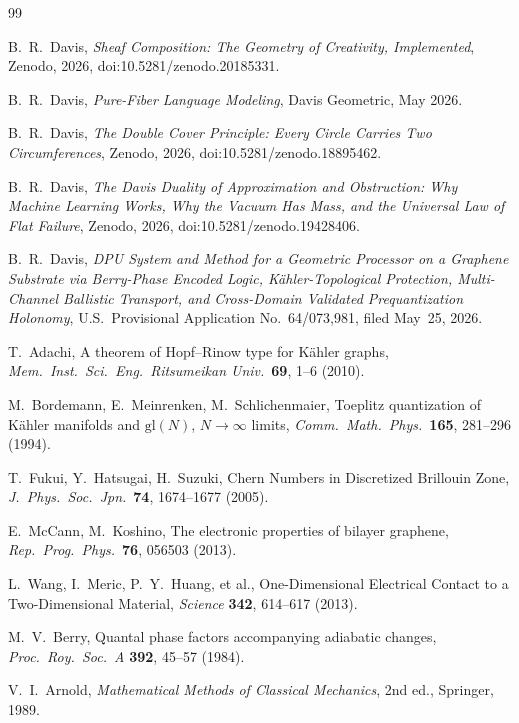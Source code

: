 \documentclass[11pt,letterpaper]{article}
\begin{document}
\begin{thebibliography}{99}

B.~R.\ Davis,
\emph{Sheaf Composition: The Geometry of Creativity, Implemented},
Zenodo, 2026, doi:10.5281/zenodo.20185331.

B.~R.\ Davis,
\emph{Pure-Fiber Language Modeling},
Davis Geometric, May 2026.

B.~R.\ Davis,
\emph{The Double Cover Principle: Every Circle Carries Two
Circumferences},
Zenodo, 2026, doi:10.5281/zenodo.18895462.

B.~R.\ Davis,
\emph{The Davis Duality of Approximation and Obstruction: Why
Machine Learning Works, Why the Vacuum Has Mass, and the Universal
Law of Flat Failure},
Zenodo, 2026, doi:10.5281/zenodo.19428406.

B.~R.\ Davis,
\emph{DPU System and Method for a Geometric Processor on a Graphene
Substrate via Berry-Phase Encoded Logic, K\"ahler-Topological
Protection, Multi-Channel Ballistic Transport, and Cross-Domain
Validated Prequantization Holonomy},
U.S.\ Provisional Application No.~64/073,981, filed May~25, 2026.

T.~Adachi,
A theorem of Hopf--Rinow type for K\"ahler graphs,
\emph{Mem.\ Inst.\ Sci.\ Eng.\ Ritsumeikan Univ.}\ \textbf{69},
1--6 (2010).

M.~Bordemann, E.~Meinrenken, M.~Schlichenmaier,
Toeplitz quantization of K\"ahler manifolds and $\mathrm{gl}(N)$,
$N \to \infty$ limits,
\emph{Comm.\ Math.\ Phys.}\ \textbf{165}, 281--296 (1994).

T.~Fukui, Y.~Hatsugai, H.~Suzuki,
Chern Numbers in Discretized Brillouin Zone,
\emph{J.\ Phys.\ Soc.\ Jpn.}\ \textbf{74}, 1674--1677 (2005).

E.~McCann, M.~Koshino,
The electronic properties of bilayer graphene,
\emph{Rep.\ Prog.\ Phys.}\ \textbf{76}, 056503 (2013).

L.~Wang, I.~Meric, P.~Y.~Huang, et al.,
One-Dimensional Electrical Contact to a Two-Dimensional Material,
\emph{Science} \textbf{342}, 614--617 (2013).

M.~V.\ Berry,
Quantal phase factors accompanying adiabatic changes,
\emph{Proc.\ Roy.\ Soc.\ A} \textbf{392}, 45--57 (1984).

V.~I.\ Arnold,
\emph{Mathematical Methods of Classical Mechanics}, 2nd ed.,
Springer, 1989.

\end{thebibliography}
\end{document}
